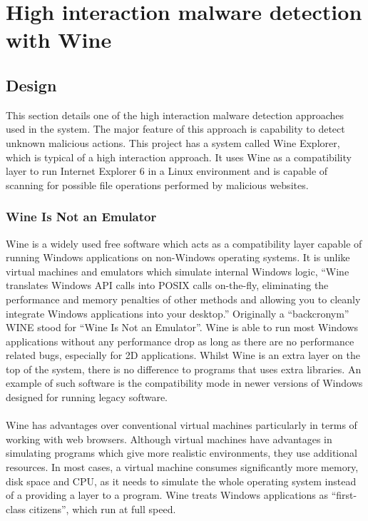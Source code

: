 \section{High interaction malware detection with Wine}
\subsection{Design}
This section details one of the high interaction malware detection 
approaches used in the system. The major 
feature of this approach is capability to detect unknown malicious 
actions. This project has a system called Wine Explorer, 
which is typical of a high interaction approach. It uses Wine as a compatibility layer to run 
Internet Explorer 6 in a Linux environment and is capable of scanning for 
possible file operations performed by malicious websites. 

\subsubsection{Wine Is Not an Emulator}
Wine is a widely used free software which acts as a compatibility layer 
capable of running Windows applications on non-Windows operating 
systems.\cite{wikiwine} It is unlike virtual machines and emulators which simulate 
internal Windows logic, ``Wine translates Windows API calls into POSIX calls 
on-the-fly, eliminating the performance and memory penalties of other methods 
and allowing you to cleanly integrate Windows applications into your 
desktop.''\cite{aboutwine} Originally a ``backcronym'' WINE stood for ``Wine Is Not an 
Emulator''. Wine is able to run most Windows applications 
without any performance drop as long as there are no performance related bugs, 
especially for 2D applications. Whilst Wine is an 
extra layer on the top of the system, there is no difference to programs that 
uses extra libraries. An example of such software is the compatibility 
mode in newer versions of Windows designed for running legacy 
software.\cite{wineperformance}
\paragraph{}
Wine has advantages over conventional virtual machines particularly in terms 
of working with web browsers. Although 
virtual machines have advantages in simulating programs which give more 
realistic environments, they use additional resources. In most cases, a 
virtual machine consumes significantly more memory, disk space and CPU, as it 
needs to simulate the whole operating system instead of a providing a layer 
to a program. Wine treats Windows applications as ``first-class citizens'', 
which run at full speed.\cite{wineperformance}
